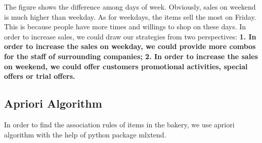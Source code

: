 \documentclass[11pt]{article}
\begin{document}
    The figure shows the difference among days of week. Obviously, sales on
weekend is much higher than weekday. As for weekdays, the items sell the
most on Friday. This is because people have more times and willings to
shop on these days. In order to increase sales, we could draw our
strategies from two perspectives: \textbf{1. In order to increase the
sales on weekday, we could provide more combos for the staff of
surrounding companies; 2. In order to increase the sales on weekend, we
could offer customers promotional activities, special offers or trial
offers.}

    \hypertarget{apriori-algorithm}{%
\subsection{Apriori Algorithm}\label{apriori-algorithm}}

In order to find the association rules of items in the bakery, we use
apriori algorithm with the help of python package mlxtend.
\end{document}
